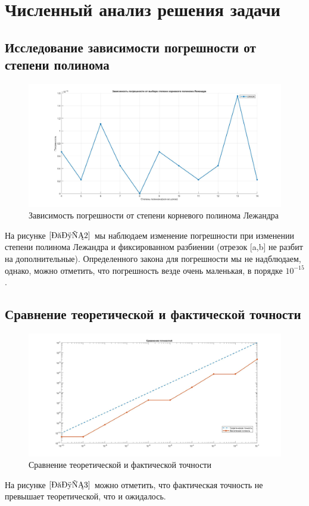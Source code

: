 \documentclass[a4paper]{article}
\begin{document}
\newpage
\section{Численный анализ решения задачи}


\subsection{Исследование зависимости погрешности от степени полинома} 

\begin{figure}[h!]
\begin{center}
\includegraphics[scale=0.3]{график зависимости погрешности от степени полинома Лежандра.jpg} 
\end{center}
\caption{Зависимость погрешности от степени корневого полинома Лежандра} \label{Рис2}
\end{figure}
На рисунке $\ref{Рис2}$ мы наблюдаем изменение погрешности при изменении степени полинома Лежандра и фиксированном разбиении (отрезок [a,b] не разбит на дополнительные). Определенного закона для погрешности мы не надблюдаем, однако, можно отметить, что погрешность везде очень маленькая, в порядке $10^{-15}$.


\subsection{Сравнение теоретической и фактической точности} 

\begin{figure}[h!]
\begin{center}
\includegraphics[scale=0.3]{точность.jpg} 
\end{center}
\caption{Сравнение теоретической и фактической точности} \label{Рис3}
\end{figure}
На рисунке $\ref{Рис3}$ можно отметить, что фактическая точность не превышает теоретической, что и ожидалось.\\
\end{document}
